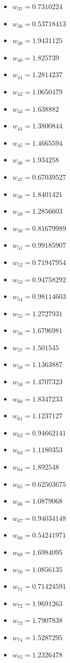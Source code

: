 \documentclass[11pt]{article}
\begin{document}
\begin{itemize}
\item $w_{37} = 0.7310224$
\item $w_{38} = 0.53718413$
\item $w_{39} = 1.9431125$
\item $w_{40} = 1.825739$
\item $w_{41} = 1.2814237$
\item $w_{42} = 1.0650479$
\item $w_{43} = 1.638882$
\item $w_{44} = 1.3800844$
\item $w_{45} = 1.4665594$
\item $w_{46} = 1.934258$
\item $w_{47} = 0.67039527$
\item $w_{48} = 1.8401421$
\item $w_{49} = 1.2856603$
\item $w_{50} = 0.81679989$
\item $w_{51} = 0.99185907$
\item $w_{52} = 0.71947954$
\item $w_{53} = 0.94758292$
\item $w_{54} = 0.98114603$
\item $w_{55} = 1.2727931$
\item $w_{56} = 1.6796981$
\item $w_{57} = 1.501545$
\item $w_{58} = 1.1363887$
\item $w_{59} = 1.4707323$
\item $w_{60} = 1.8347233$
\item $w_{61} = 1.1237127$
\item $w_{62} = 0.94662141$
\item $w_{63} = 1.1180353$
\item $w_{64} = 1.892548$
\item $w_{65} = 0.62503675$
\item $w_{66} = 1.0879068$
\item $w_{67} = 0.94034148$
\item $w_{68} = 0.54241971$
\item $w_{69} = 1.6984095$
\item $w_{70} = 1.0856135$
\item $w_{71} = 0.71424591$
\item $w_{72} = 1.9691263$
\item $w_{73} = 1.7907838$
\item $w_{74} = 1.5287295$
\item $w_{75} = 1.2326478$

\end{itemize}
\end{document}
